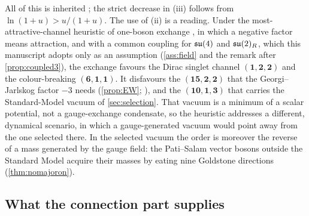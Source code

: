 All of this is inherited \cite{NambuJonaLasinio61,Slansky}; the strict decrease in (iii) follows from $\ln(1+u)>u/(1+u)$. The use of (ii) is a reading.
Under the most-attractive-channel heuristic of one-boson exchange \cite{RabyDimopoulosSusskind80}, in which a negative factor means attraction, and
with a common coupling for $\mathfrak{su}(4)$ and $\mathfrak{su}(2)_R$, which this manuscript adopts only as an assumption (\cref{ass:field} and the remark after
\cref{prop:coupled3}), the exchange favours the Dirac singlet channel $(\mathbf1,\mathbf2,\mathbf2)$ and the colour-breaking $(\mathbf6,\mathbf1,\mathbf1)$.
It disfavours the $(\mathbf{15},\mathbf2,\mathbf2)$ that the Georgi--Jarlskog factor $-3$ needs (\cref{prop:EW}; \cite{GeorgiJarlskog79}), and the
$(\mathbf{10},\mathbf1,\mathbf3)$ that carries the Standard-Model vacuum of \cref{sec:selection}. That vacuum is a minimum of a scalar potential, not a
gauge-exchange condensate, so the heuristic addresses a different, dynamical scenario, in which a gauge-generated vacuum would point away from the
one selected there. In the selected vacuum the order is moreover the reverse of a mass generated by the gauge field: the Pati--Salam vector bosons
outside the Standard Model acquire their masses by eating nine Goldstone directions (\cref{thm:nomajoron}).

\subsection{What the connection part supplies}
\label{sec:bf-synthesis}

